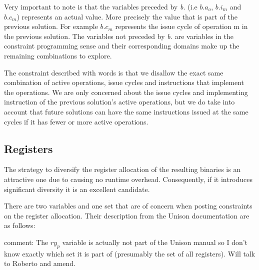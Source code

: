 Very important to note is that the variables preceded by \textit{b.} (i.e $b.a_o$, $b.i_m$
and $b.c_m$) represents an actual value. More precisely the value that is part of the
previous solution. For example $b.c_m$ represents the issue cycle of operation m in the
previous solution. The variables not preceded by \textit{b.} are variables in the
constraint programming sense and their corresponding domains make up the remaining
combinations to explore.

The constraint described with words is that we disallow the exact same combination of
active operations, issue cycles and instructions that implement the operations. We are
only concerned about the issue cycles and implementing instruction of the previous
solution's active operations, but we do take into account that future solutions can have
the same instructions issued at the same cycles if it has fewer or more active operations.

\subsection{Registers}

The strategy to diversify the register allocation of the resulting binaries is an attractive
one due to causing no runtime overhead. Consequently, if it introduces significant diversity
it is an excellent candidate.

There are two variables and one set that are of concern when posting constraints on the register
allocation. Their description from the Unison documentation are as follows:

\vspace{0.2cm}

\noindent{}

\vspace{0.2cm}

comment: The $ry_p$ variable is actually not part of the Unison manual so I don't know
exactly which set it is part of (presumably the set of all registers). Will talk to
Roberto and amend.

